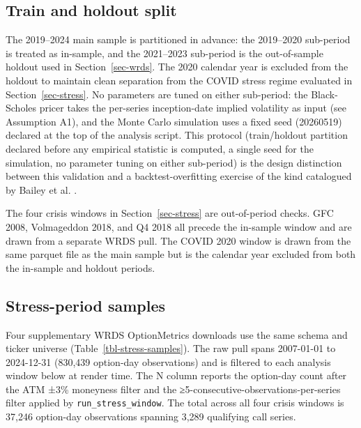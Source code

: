 \documentclass[
  11pt,
  letterpaper,
  DIV=12,
  numbers=noendperiod]{scrartcl}
\numberwithin{equation}{section}
\numberwithin{figure}{section}
\numberwithin{table}{section}
\begin{document}
\subsection{Train and holdout split}\label{train-and-holdout-split}

The 2019--2024 main sample is partitioned in advance: the 2019--2020
sub-period is treated as in-sample, and the 2021--2023 sub-period is the
out-of-sample holdout used in Section~\ref{sec-wrds}. The 2020 calendar
year is excluded from the holdout to maintain clean separation from the
COVID stress regime evaluated in Section~\ref{sec-stress}. No parameters
are tuned on either sub-period: the Black-Scholes pricer takes the
per-series inception-date implied volatility as input (see Assumption
A1), and the Monte Carlo simulation uses a fixed seed (20260519)
declared at the top of the analysis script. This protocol (train/holdout
partition declared before any empirical statistic is computed, a single
seed for the simulation, no parameter tuning on either sub-period) is
the design distinction between this validation and a
backtest-overfitting exercise of the kind catalogued by Bailey et al.
.

The four crisis windows in Section~\ref{sec-stress} are out-of-period
checks. GFC 2008, Volmageddon 2018, and Q4 2018 all precede the
in-sample window and are drawn from a separate WRDS pull. The COVID 2020
window is drawn from the same parquet file as the main sample but is the
calendar year excluded from both the in-sample and holdout periods.

\subsection{Stress-period samples}\label{stress-period-samples}

Four supplementary WRDS OptionMetrics downloads use the same schema and
ticker universe (Table~\ref{tbl-stress-samples}). The raw pull spans
2007-01-01 to 2024-12-31 (830,439 option-day observations) and is
filtered to each analysis window below at render time. The N column
reports the option-day count after the ATM ±3\% moneyness filter and the
≥5-consecutive-observations-per-series filter applied by
\texttt{run\_stress\_window}. The total across all four crisis windows
is 37,246 option-day observations spanning 3,289 qualifying call series.
\end{document}
